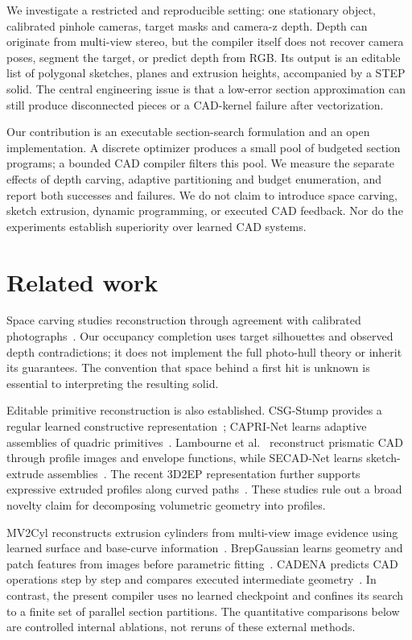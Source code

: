 \documentclass[10pt]{article}
\begin{document}
We investigate a restricted and reproducible setting: one stationary object,
calibrated pinhole cameras, target masks and camera-z depth. Depth can originate
from multi-view stereo, but the compiler itself does not recover camera poses,
segment the target, or predict depth from RGB. Its output is an editable list of
polygonal sketches, planes and extrusion heights, accompanied by a STEP solid.
The central engineering issue is that a low-error section approximation can
still produce disconnected pieces or a CAD-kernel failure after vectorization.

Our contribution is an executable section-search formulation and an open
implementation. A discrete optimizer produces a small pool of budgeted section
programs; a bounded CAD compiler filters this pool. We measure the separate
effects of depth carving, adaptive partitioning and budget enumeration, and
report both successes and failures. We do not claim to introduce space carving,
sketch extrusion, dynamic programming, or executed CAD feedback. Nor do the
experiments establish superiority over learned CAD systems.

\section{Related work}
Space carving studies reconstruction through agreement with calibrated
photographs~\cite{kutulakos2000}. Our occupancy completion uses target silhouettes
and observed depth contradictions; it does not implement the full photo-hull
theory or inherit its guarantees. The convention that space behind a first hit
is unknown is essential to interpreting the resulting solid.

Editable primitive reconstruction is also established. CSG-Stump provides a
regular learned constructive representation~\cite{csgstump2021}; CAPRI-Net learns
adaptive assemblies of quadric primitives~\cite{capri2022}. Lambourne et
al.~\cite{lambourne2022} reconstruct prismatic CAD through profile images and
envelope functions, while SECAD-Net learns sketch-extrude
assemblies~\cite{secad2023}. The recent 3D2EP representation further supports
expressive extruded profiles along curved paths~\cite{sun2025}. These studies
rule out a broad novelty claim for decomposing volumetric geometry into profiles.

MV2Cyl reconstructs extrusion cylinders from multi-view image evidence using
learned surface and base-curve information~\cite{mv2cyl2024}. BrepGaussian learns
geometry and patch features from images before parametric
fitting~\cite{brepgaussian2026}. CADENA predicts CAD operations step by step and
compares executed intermediate geometry~\cite{cadena2026}. In contrast, the
present compiler uses no learned checkpoint and confines its search to a finite
set of parallel section partitions. The quantitative comparisons below are
controlled internal ablations, not reruns of these external methods.
\end{document}
